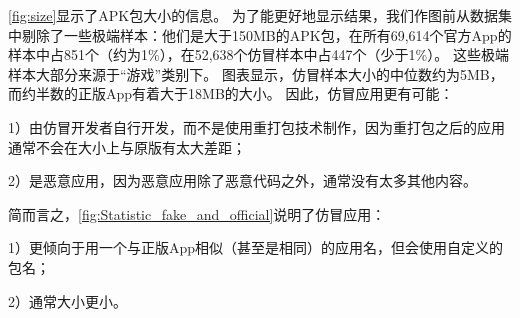 \autoref{fig:size}显示了APK包大小的信息。
为了能更好地显示结果，我们作图前从数据集中剔除了一些极端样本：他们是大于150MB的APK包，在所有69,614个官方App的样本中占851个（约为1\%），在52,638个仿冒样本中占447个（少于1\%）。
这些极端样本大部分来源于``游戏''类别下。
图表显示，仿冒样本大小的中位数约为5MB，而约半数的正版App有着大于18MB的大小。
因此，仿冒应用更有可能：

1）由仿冒开发者自行开发，而不是使用重打包技术制作，因为重打包之后的应用通常不会在大小上与原版有太大差距；

2）是恶意应用，因为恶意应用除了恶意代码之外，通常没有太多其他内容。

简而言之，\autoref{fig:Statistic_fake_and_official}说明了仿冒应用：

1）更倾向于用一个与正版App相似（甚至是相同）的应用名，但会使用自定义的包名；

2）通常大小更小。

